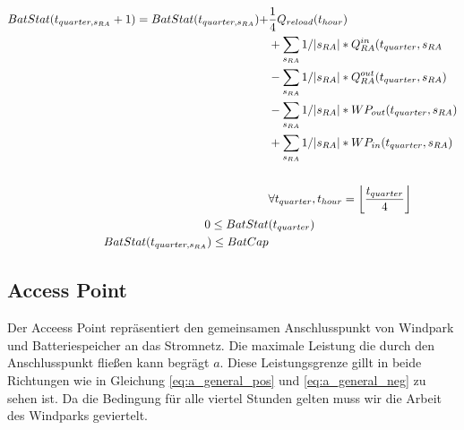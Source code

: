 \begin{alignat}{3}
	BatStat(t_{quarter, s_{RA}} + 1)  = BatStat(t_{quarter, s_{RA}}) + & \frac{1}{4} Q_{reload}(t_{hour})\notag                                                               \\
	                                                                   & +\sum_{s_{RA}}1/|s_{RA}|  * Q^{in}_{RA}(t_{quarter}, s_{RA}\notag                                    \\
	                                                                   & - \sum_{s_{RA}}1/|s_{RA}|  * Q^{out}_{RA}(t_{quarter}, s_{RA})\notag                                 \\
	                                                                   & - \sum_{s_{RA}}1/|s_{RA}|  * WP_{out}(t_{quarter}, s_{RA})\notag                                     \\
	                                                                   & + \sum_{s_{RA}}1/|s_{RA}|  * WP_{in}(t_{quarter}, s_{RA})\notag                                      \\                                   \\
	                                                                   & \forall t_{quarter}, t_{hour} = \left\lfloor \frac{t_{quarter}}{4} \right\rfloor  \label{eq:BatStat} \\
	0 \leq  BatStat                                                    & (t_{quarter}) 			\label{eq:BatStat_nonNeg}                                                           \\
	BatStat(t_{quarter, s_{RA}}) \leq  BatCap                          & \label{eq:BatStat_cap}
\end{alignat}


\subsection{Access Point}
Der Acceess Point repräsentiert den gemeinsamen Anschlusspunkt von Windpark und Batteriespeicher an das Stromnetz.
Die maximale Leistung die durch den Anschlusspunkt fließen kann begrägt  $a$. Diese Leistungsgrenze gillt in beide Richtungen
wie in Gleichung \ref{eq:a_general_pos} und \ref{eq:a_general_neg} zu sehen ist. Da die Bedingung für alle viertel Stunden gelten muss
wir die Arbeit des Windparks geviertelt.

